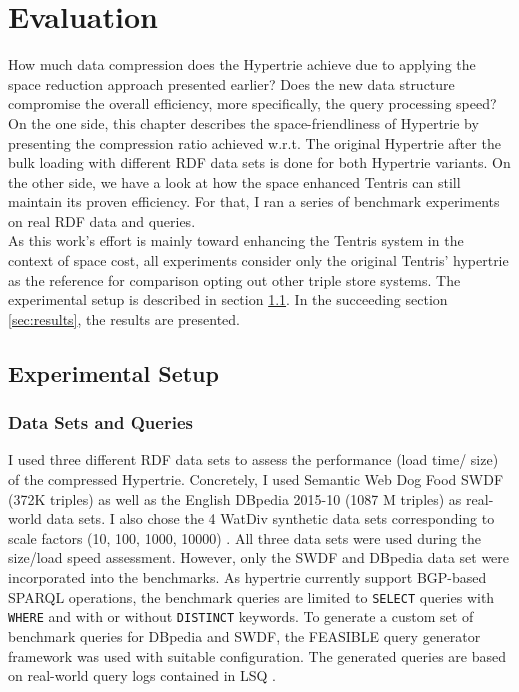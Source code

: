 \chapter{Evaluation}
\label{ch:evaluation}

How much data compression does the Hypertrie achieve due to applying the space reduction approach presented earlier? 
Does the new data structure compromise the overall efficiency, more specifically, the query processing speed? 
On the one side, this chapter describes the space-friendliness of Hypertrie by presenting the compression ratio achieved w.r.t. The original Hypertrie after the bulk loading with different RDF data sets is done for both Hypertrie variants.  
On the other side, we have a look at how the space enhanced Tentris can still maintain its proven efficiency. For that, I ran a series of benchmark experiments on real RDF data and queries. \\

As this work's effort is mainly toward enhancing the Tentris system in the context of space cost, all experiments consider only the original Tentris' hypertrie as the reference for comparison opting out other triple store systems. The experimental setup is described in section \ref{sec:exper_setup}. In the succeeding section \ref{sec:results}, the results are presented.

\section{Experimental Setup}
\label{sec:exper_setup}

\subsection{Data Sets and Queries}
\label{subsec:datasets}

 I used three different RDF data sets to assess the performance  (load time/ size) of the compressed Hypertrie. Concretely, I used Semantic Web Dog Food SWDF (372K triples) as well as the English DBpedia 2015-10 (1087 M triples) as real-world data sets. 
I also chose the 4 WatDiv synthetic data sets corresponding to scale factors (10, 100, 1000, 10000) \cite{WatDiv}. All three data sets were used during the size/load speed assessment. However, only the SWDF and DBpedia data set were incorporated into the benchmarks. As hypertrie currently support BGP-based SPARQL operations, the benchmark queries are limited to \verb|SELECT| queries with \verb|WHERE| and with or without \verb|DISTINCT| keywords. To generate a custom set of benchmark queries for DBpedia and SWDF, the FEASIBLE \cite{feasible} query generator framework was used with suitable configuration. The generated queries are based on real-world query logs contained in LSQ \cite{lsq}.

